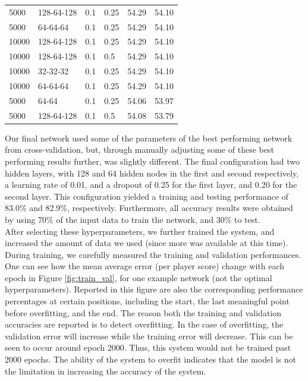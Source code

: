 \begin{table}[]
\begin{tabular}{llllll}
5000       & 128-64-128    & 0.1           & 0.25    & 54.29            & 54.10           \\
5000       & 64-64-64      & 0.1           & 0.25    & 54.29            & 54.10           \\
10000      & 128-64-128    & 0.1           & 0.25    & 54.29            & 54.10           \\
10000      & 128-64-128    & 0.1           & 0.5     & 54.29            & 54.10           \\
10000      & 32-32-32      & 0.1           & 0.25    & 54.29            & 54.10           \\
10000      & 64-64-64      & 0.1           & 0.25    & 54.29            & 54.10           \\
5000       & 64-64         & 0.1           & 0.25    & 54.06            & 53.97           \\
5000       & 128-64-128    & 0.1           & 0.5     & 54.08            & 53.79          
\end{tabular}
\end{table}
Our final network  used some of the parameters of the best performing network from cross-validation, but, through manually adjusting some of these best performing results further, was slightly different. The final configuration had two hidden layers, with 128 and 64 hidden nodes in the first and second respectively, a learning rate of 0.01, and a dropout of 0.25 for the first layer, and 0.20 for the second layer. This configuration yielded a training and testing performance of 83.0\% and 82.9\%, respectively. Furthermore, all accuracy results were obtained by using 70\% of the input data to train the network, and 30\% to test.\\
After selecting these hyperparameters, we further trained the system, and increased the amount of data we used (since more was available at this time). During training, we carefully measured the training and validation performances. One can see how the mean average error (per player score) change with each epoch in Figure \ref{fig:train_val}, for one example network (not the optimal hyperparameters). Reported in this figure are also the corresponding performance percentages at certain positions, including the start, the last meaningful point before overfitting, and the end. The reason both the training and validation accuracies are reported is to detect overfitting. In the case of overfitting, the validation error will increase while the training error will decrease. This can be seen to occur around epoch 2000. Thus, this system would not be trained past 2000 epochs. The ability of the system to overfit indicates that the model is not the limitation in increasing the accuracy of the system.

